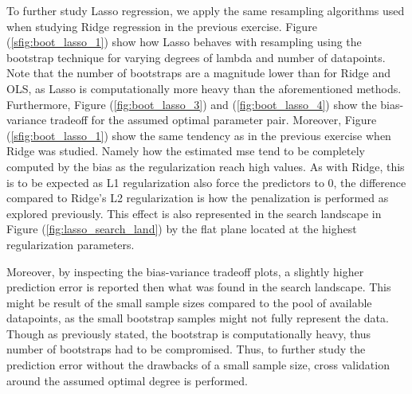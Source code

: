 \documentclass[11pt, a4paper]{article}
\begin{document}
To further study Lasso regression, we apply the same resampling algorithms used when studying Ridge regression in the previous exercise. Figure (\ref{sfig:boot_lasso_1}) show how Lasso behaves with resampling using the bootstrap technique for varying degrees of lambda and number of datapoints. Note that the number of bootstraps are a magnitude lower than for Ridge and OLS, as Lasso is computationally more heavy than the aforementioned methods. Furthermore, Figure (\ref{fig:boot_lasso_3}) and (\ref{fig:boot_lasso_4}) show the bias-variance tradeoff for the assumed optimal parameter pair. Moreover, Figure (\ref{sfig:boot_lasso_1}) show the same tendency as in the previous exercise when Ridge was studied. Namely how the estimated mse tend to be completely computed by the bias as the regularization reach high values. As with Ridge, this is to be expected as L1 regularization also force the predictors to 0, the difference compared to Ridge's L2 regularization is how the penalization is performed as explored previously. This effect is also represented in the search landscape in Figure (\ref{fig:lasso_search_land}) by the flat plane located at the highest regularization parameters. 

Moreover, by inspecting the bias-variance tradeoff plots, a slightly higher prediction error is reported then what was found in the search landscape. This might be result of the small sample sizes compared to the pool of available datapoints, as the small bootstrap samples might not fully represent the data. Though as previously stated, the bootstrap is computationally heavy, thus number of bootstraps had to be compromised. Thus, to further study the prediction error without the drawbacks of a small sample size, cross validation around the assumed optimal degree is performed.
\end{document}
